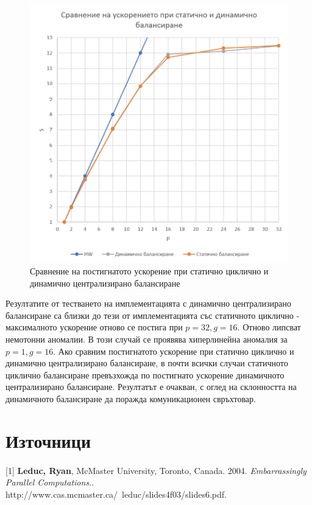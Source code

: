 \documentclass[a4paper,11pt]{article}
\begin{document}
\begin{figure}[H]
    \centering
    \includegraphics[width=0.9\linewidth]{images/MandelComparisson.png}
    \caption{Сравнение на постигнатото ускорение при статично циклично и динамично централизирано балансиране}
    \label{fig:mandeltest-comparison}
\end{figure}
Резултатите от тестването на имплементацията с динамично централизирано балансиране са близки до тези от имплементацията със статичното циклично - максималното ускорение отново се постига при $p=32, g=16$. 
Отново липсват немотонни аномалии. В този случай се проявява хиперлинейна аномалия за $p=1, g=16$. 
Ако сравним постигнатото ускорение при статично циклично и динамично централизирано балансиране, в почти всички случаи статичното циклично балансиране превъзхожда по постигнато ускорение динамичното централизирано балансиране. Резултатът е очакван, с оглед на склонността на динамичното балансиране да поражда комуникационен свръхтовар. 
%  
\cleardoublepage
\section{Източници}
\paragraph{}[1] \textbf{Leduc, Ryan}, McMaster University, Toronto, Canada. 2004. \emph{Embarrassingly Parallel Computations.}. http://www.cas.mcmaster.ca/~leduc/slides4f03/slides6.pdf.
\end{document}
